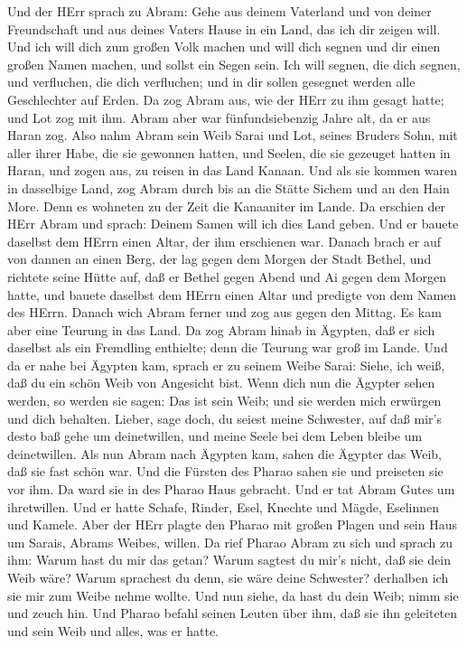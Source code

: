  Und der HErr sprach zu Abram: Gehe aus deinem Vaterland und
von deiner Freundschaft und aus deines Vaters Hause in ein Land, das ich
dir zeigen will.  Und ich will dich zum großen Volk machen
und will dich segnen und dir einen großen Namen machen, und sollst ein
Segen sein.  Ich will segnen, die dich segnen, und
verfluchen, die dich verfluchen; und in dir sollen gesegnet werden alle
Geschlechter auf Erden.  Da zog Abram aus, wie der HErr zu
ihm gesagt hatte; und Lot zog mit ihm. Abram aber war fünfundsiebenzig
Jahre alt, da er aus Haran zog.  Also nahm Abram sein Weib
Sarai und Lot, seines Bruders Sohn, mit aller ihrer Habe, die sie
gewonnen hatten, und Seelen, die sie gezeuget hatten in Haran, und zogen
aus, zu reisen in das Land Kanaan. Und als sie kommen waren in
dasselbige Land,  zog Abram durch bis an die Stätte Sichem
und an den Hain More. Denn es wohneten zu der Zeit die Kanaaniter im
Lande.  Da erschien der HErr Abram und sprach: Deinem Samen
will ich dies Land geben. Und er bauete daselbst dem HErrn einen Altar,
der ihm erschienen war.  Danach brach er auf von dannen an
einen Berg, der lag gegen dem Morgen der Stadt Bethel, und richtete
seine Hütte auf, daß er Bethel gegen Abend und Ai gegen dem Morgen
hatte, und bauete daselbst dem HErrn einen Altar und predigte von dem
Namen des HErrn.  Danach wich Abram ferner und zog aus gegen
den Mittag.  Es kam aber eine Teurung in das Land. Da zog
Abram hinab in Ägypten, daß er sich daselbst als ein Fremdling
enthielte; denn die Teurung war groß im Lande.  Und da er
nahe bei Ägypten kam, sprach er zu seinem Weibe Sarai: Siehe, ich weiß,
daß du ein schön Weib von Angesicht bist.  Wenn dich nun
die Ägypter sehen werden, so werden sie sagen: Das ist sein Weib; und
sie werden mich erwürgen und dich behalten.  Lieber, sage
doch, du seiest meine Schwester, auf daß mir's desto baß gehe um
deinetwillen, und meine Seele bei dem Leben bleibe um deinetwillen.
 Als nun Abram nach Ägypten kam, sahen die Ägypter das
Weib, daß sie fast schön war.  Und die Fürsten des Pharao
sahen sie und preiseten sie vor ihm. Da ward sie in des Pharao Haus
gebracht.  Und er tat Abram Gutes um ihretwillen. Und er
hatte Schafe, Rinder, Esel, Knechte und Mägde, Eselinnen und Kamele.
 Aber der HErr plagte den Pharao mit großen Plagen und sein
Haus um Sarais, Abrams Weibes, willen.  Da rief Pharao
Abram zu sich und sprach zu ihm: Warum hast du mir das getan? Warum
sagtest du mir's nicht, daß sie dein Weib wäre?  Warum
sprachest du denn, sie wäre deine Schwester? derhalben ich sie mir zum
Weibe nehme wollte. Und nun siehe, da hast du dein Weib; nimm sie und
zeuch hin.  Und Pharao befahl seinen Leuten über ihm, daß
sie ihn geleiteten und sein Weib und alles, was er hatte.

